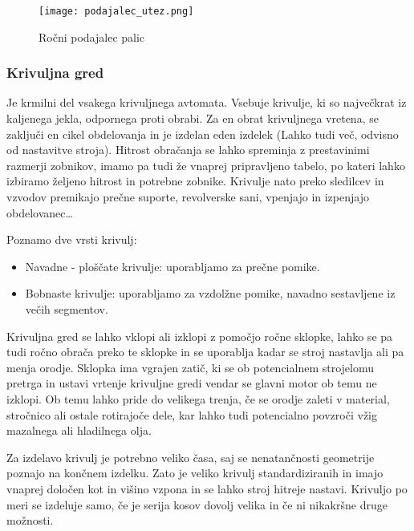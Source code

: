 \begin{figure}[H]
	\begin{center}
		\texttt{[image: podajalec\_utez.png]}
		\caption{Ročni podajalec palic
			\cite{interna}}
		\label{shema_rocnega_podajalca}
	\end{center}
\end{figure}

\subsubsection{Krivuljna gred}
Je krmilni del vsakega krivuljnega avtomata. Vsebuje krivulje,
ki so največkrat iz kaljenega jekla, odpornega proti obrabi. Za en
obrat krivuljnega vretena, se zaključi en cikel obdelovanja in je
izdelan eden izdelek (Lahko tudi več, odvisno od nastavitve stroja).
Hitrost obračanja se lahko spreminja z prestavinimi razmerji
zobnikov, imamo pa tudi že vnaprej pripravljeno tabelo, po kateri
lahko izbiramo željeno hitrost in potrebne zobnike. Krivulje nato
preko sledilcev in vzvodov premikajo prečne suporte,
revolverske sani, vpenjajo in izpenjajo obdelovanec…

\noindent Poznamo dve vrsti krivulj:
\begin{itemize}
	\item Navadne - ploščate krivulje: uporabljamo za prečne pomike.
	\item Bobnaste krivulje: uporabljamo za vzdolžne pomike, navadno
	      sestavljene iz večih segmentov.
\end{itemize}

Krivuljna gred se lahko vklopi ali izklopi z pomočjo ročne sklopke,
lahko se pa tudi ročno obrača preko te sklopke in se uporablja kadar
se stroj nastavlja ali pa menja orodje. Sklopka ima vgrajen
zatič, ki se ob potencialnem strojelomu pretrga in ustavi vrtenje
krivuljne gredi vendar se glavni motor ob temu ne izklopi.
Ob temu lahko pride do velikega trenja, če se orodje zaleti v
material, stročnico ali ostale rotirajoče dele, kar lahko tudi
potencialno povzroči vžig mazalnega ali hladilnega olja.

Za izdelavo krivulj je potrebno veliko časa, saj
se nenatančnosti geometrije poznajo na končnem izdelku. Zato je
veliko krivulj standardiziranih in imajo vnaprej določen kot in
višino vzpona in se lahko stroj hitreje nastavi. Krivuljo po
meri se izdeluje samo, če je serija kosov dovolj velika in če ni
nikakršne druge možnosti.


